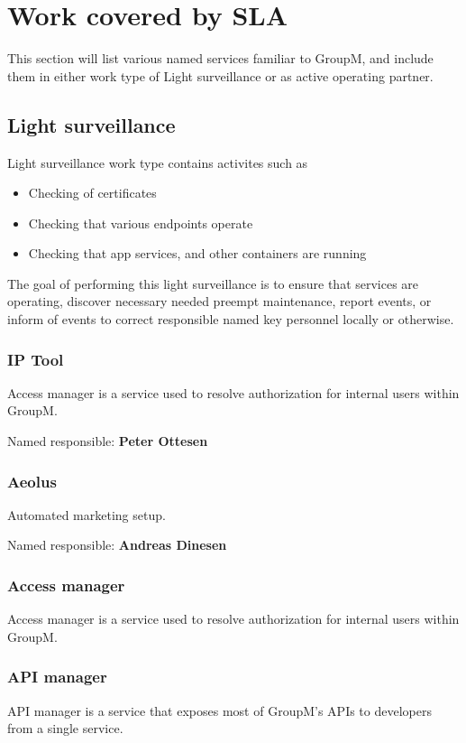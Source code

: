 \section{Work covered by SLA}
This section will list various named services familiar to GroupM, and include them in either work type of Light surveillance or as active operating partner.



\subsection{Light surveillance}

Light surveillance work type contains activites such as

\begin{itemize}
\item Checking of certificates
\item Checking that various endpoints operate
\item Checking that app services, and other containers are running
\end{itemize}

The goal of performing this light surveillance is to ensure that services are operating, discover necessary needed preempt maintenance, report events, or inform of events to correct responsible named key personnel locally or otherwise.

\subsubsection{IP Tool}
Access manager is a service used to resolve authorization for internal users within GroupM. 

Named responsible: \textbf{Peter Ottesen} 


\subsubsection{Aeolus}
Automated marketing setup.

Named responsible: \textbf{Andreas Dinesen}

\subsubsection{Access manager}
Access manager is a service used to resolve authorization for internal users within GroupM. 

\subsubsection{API manager}
API manager is a service that exposes most of GroupM's APIs to developers from a single service.

